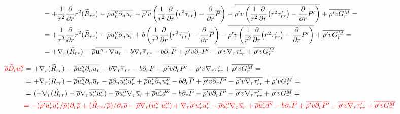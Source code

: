 \documentclass[10pt,paper=a4]{report}
\newcommand{\eht}{\overline}
\newcommand{\fht}{\widetilde}
\newcommand{\dr}{\frac{\partial}{\partial r}}
\begin{document}
\begin{align}
& = +\frac{1}{r^2}\dr r^2 (\fht{R}_{rr}) - \eht{\rho}\eht{u''_n\partial_n u_r} - \eht{\rho' v} \left(\frac{1}{r^{2}} \frac{\partial}{\partial r} \big( r^{2} \eht{\tau_{rr}} \big) - \frac{\partial}{\partial r} \eht{P} \right) - \eht{\rho' v \left(\frac{1}{r^{2}} \frac{\partial}{\partial r} \big( r^{2} \tau'_{rr} \big) - \frac{\partial}{\partial r} P' \right) }  + \eht{\rho' v G_r^M} = \\
& = +\frac{1}{r^2}\dr r^2 (\fht{R}_{rr}) - \eht{\rho}\eht{u''_n\partial_n u_r} + b\left(\frac{1}{r^{2}} \frac{\partial}{\partial r} \big( r^{2} \eht{\tau_{rr}} \big) - \frac{\partial}{\partial r} \eht{P} \right) - \eht{\rho' v \left(\frac{1}{r^{2}} \frac{\partial}{\partial r} \big( r^{2} \tau'_{rr} \big) - \frac{\partial}{\partial r} P' \right) }  + \eht{\rho' v G_r^M} = \\
& = +\nabla_r ( \fht{R}_{rr} ) - \eht{\rho}\eht{{\bf{u''}} \cdot \nabla u_r} -b \nabla_r \eht{\tau}_{rr} - b\partial_r \eht{P} + \eht{\rho' v \partial_r P'} - \eht{\rho' v \nabla_r  \tau'_{rr} }  + \eht{\rho' v G_r^M} 
\end{align}

\begin{align}
{\color{red} \eht{\rho}\fht{D}_t \eht{u''_r} }& =  +\nabla_r ( \fht{R}_{rr} ) - \eht{\rho}\eht{u''_n \partial_n u_r} -b\nabla_r \eht{\tau}_{rr}- b\partial_r \eht{P} + \eht{\rho' v \partial_r P'} - \eht{\rho' v \nabla_r  \tau'_{rr} }  + \eht{\rho' v G_r^M} = \\
& =  +\nabla_r ( \fht{R}_{rr} ) - \eht{\rho}\eht{u''_n}\partial_n \eht{u}_r - \eht{\rho}\partial_n \eht{u''_n u'_r} + \eht{\rho} \eht{u'_r\partial_n u''_n} - b\partial_r \eht{P} + \eht{\rho' v \partial_r P'} - \eht{\rho' v \nabla_r  \tau'_{rr} }  + \eht{\rho' v G_r^M} = \\
& = (+\nabla_r ( \fht{R}_{rr} ) - \eht{\rho}\nabla_r \eht{u''_r u'_r}) - \eht{\rho}\eht{u''_r} \nabla_r \eht{u}_r + \eht{\rho} \eht{u'_r d''} - b\partial_r \eht{P} + \eht{\rho' v \partial_r P'} - \eht{\rho' v \nabla_r  \tau'_{rr} }  + \eht{\rho' v G_r^M} = \\
& {\color{red} = -(\eht{\rho'u'_ru'_r}/\eht{\rho})\partial_r\eht{\rho} + (\fht{R}_{rr}/\eht{\rho})/\partial_r \eht{\rho} - \eht{\rho} \nabla_r (\eht{u''_r} \ \eht{u''_r}) + \nabla_r \overline{\rho' u'_r u'_r} - \eht{\rho}\eht{u''_r} \nabla_r \eht{u}_r + \eht{\rho} \eht{u'_r d''} - b\partial_r \eht{P} + \eht{\rho' v \partial_r P'} - \eht{\rho' v \nabla_r  \tau'_{rr} }  + \eht{\rho' v G_r^M}} 
\end{align}
\end{document}
